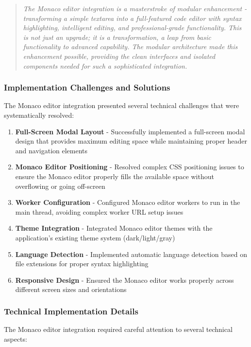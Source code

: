 \documentclass[11pt]{article}
\begin{document}
\begin{quote}
\emph{The Monaco editor integration is a masterstroke of modular enhancement - transforming a simple textarea into a full-featured code editor with syntax highlighting, intelligent editing, and professional-grade functionality. This is not just an upgrade; it is a transformation, a leap from basic functionality to advanced capability. The modular architecture made this enhancement possible, providing the clean interfaces and isolated components needed for such a sophisticated integration.}
\end{quote}

\subsubsection{Implementation Challenges and Solutions}

The Monaco editor integration presented several technical challenges that were systematically resolved:

\begin{enumerate}
\item \textbf{Full-Screen Modal Layout} - Successfully implemented a full-screen modal design that provides maximum editing space while maintaining proper header and navigation elements
\item \textbf{Monaco Editor Positioning} - Resolved complex CSS positioning issues to ensure the Monaco editor properly fills the available space without overflowing or going off-screen
\item \textbf{Worker Configuration} - Configured Monaco editor workers to run in the main thread, avoiding complex worker URL setup issues
\item \textbf{Theme Integration} - Integrated Monaco editor themes with the application's existing theme system (dark/light/gray)
\item \textbf{Language Detection} - Implemented automatic language detection based on file extensions for proper syntax highlighting
\item \textbf{Responsive Design} - Ensured the Monaco editor works properly across different screen sizes and orientations
\end{enumerate}

\subsubsection{Technical Implementation Details}

The Monaco editor integration required careful attention to several technical aspects:
\end{document}
